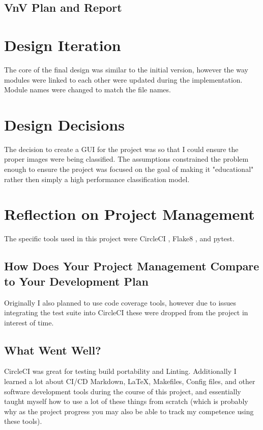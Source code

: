 \documentclass{article}
\begin{document}
\subsection{VnV Plan and Report}

\section{Design Iteration}


The core of the final design was similar to the initial version, however the way modules were linked to each other
 were updated during the implementation. Module names were changed to match the
file names.

\section{Design Decisions}

The decision to create a GUI for the project was so that I could ensure the proper images were being classified.
The assumptions constrained the problem enough to ensure the project was focused on the goal of making it "educational"
rather then simply a high performance classification model.


\section{Reflection on Project Management}

The specific tools used in this project were CircleCI \cite{CircleCI}, Flake8 \cite{Flake8},
and pytest.

\subsection{How Does Your Project Management Compare to Your Development Plan}

Originally I also planned to use code coverage tools, however due to issues integrating the test suite into CircleCI
these were dropped from the project in interest of time.

\subsection{What Went Well?}

CircleCI was great for testing build portability and Linting. Additionally I learned a lot about CI/CD Markdown, LaTeX, Makefiles, Config files,
and other software development tools during the course of this project, and essentially taught myself how to use a lot of these things
from scratch (which is probably why as the project progress you may also be able to track my competence using these tools).
\end{document}
